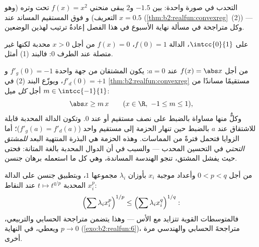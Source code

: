 \begin{omfigure}

{\small التحدب في صورة واحدة: بين $-1.5$ و$2$ يبقى
منحني $f(x) = x^2$ تحت وتره (وهو التعريف) و
فوق المستقيم المساند عند $x = 0.5$
(\cref{thm:b2:realfun:convexreg}~(2)) --- وكل متراجحة في
مسألة نهاية الأسبوع في هذا الفصل إعادةُ ترتيب لهذين
الوضعين.}
\end{omfigure}

\begin{example}
على $\intcc{0}{1}$، الدالة $f(0) = 1$، $f(x) = 0$ من أجل $x > 0$
محدبة لكنها غير متصلة عند الطرف $0$: فالبند (1)
أمثل.
\end{example}

\begin{example}\label{ex:b2:realfun:corner}
من أجل $f(x) = \abs x$ عند $a = 0$: يكون المشتقان من جهة واحدة
$f'_g(0) = -1$ و$f'_d(0) = +1$، ويوزّع
البند (2) في \cref{thm:b2:realfun:convexreg} مستقيمًا مساندًا من أجل
\emph{كل} ميل $m \in \intcc{-1}{1}$:
\[
\abs x \geq m\,x \qquad (x \in \R,\ -1 \leq m \leq 1),
\]
وكلٌّ منها مساواة بالضبط على نصف مستقيم أو عند $0$. وتكون الدالة
المحدبة قابلة للاشتقاق عند $a$ بالضبط حين تنهار الحزمة
إلى مستقيم واحد ($f'_g(a) = f'_d(a)$)؛ أما الزوايا فتحمل
فترةً من المماسات. وهذه الحزمة هي البذرة المنتهية البعد
\emph{للمشتق التحتي} في التحسين المحدب ---
والسبب في أن الدوال المحدبة بالغة المتانة: فحتى حيث يفشل
المشتق، تنجو الهندسة المساندة، وهي كل
ما استعمله برهان جنسن.
\end{example}

\begin{example}\label{ex:b2:realfun:powermeans}
من أجل $0 < p < q$ وأعداد موجبة $x_i$ بأوزان $\lambda_i$
مجموعها $1$، وبتطبيق جنسن على الدالة المحدبة $t \mapsto t^{q/p}$
عند النقاط $x_i^p$:
\[
\Bigl(\sum \lambda_i x_i^{p}\Bigr)^{1/p}
\leq \Bigl(\sum \lambda_i x_i^{q}\Bigr)^{1/q} :
\]
فالمتوسطات القوية تتزايد مع الأس --- وهذا يتضمن متراجحة الحسابي
والتربيعي، ويعطي، في النهاية $p \to 0$ (\cref{exo:b2:realfun:6})، متراجحةَ
الحسابي والهندسي مرة أخرى.
\end{example}

